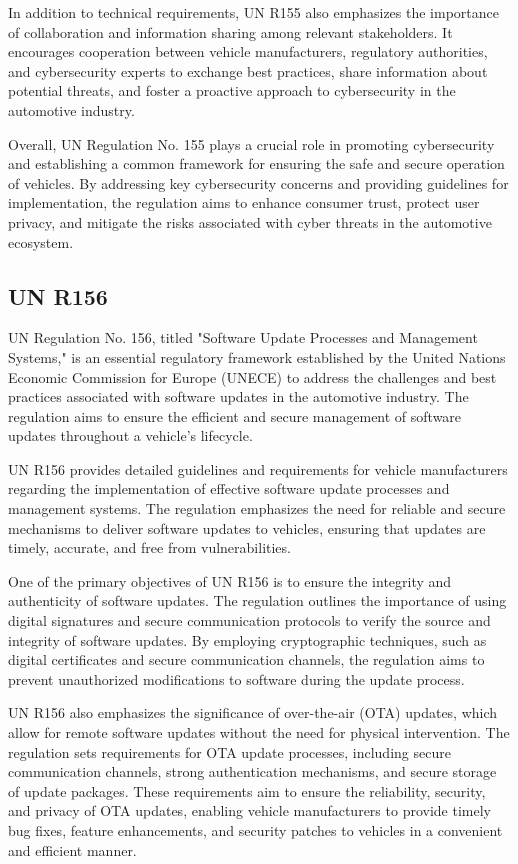 \documentclass[
12pt,
oneside, 
onehalfspacing, 
nolistspacing, 
parskip, 
chapterinoneline, 
]{AASTCOMPUTER}
\begin{document}
In addition to technical requirements, UN R155 also emphasizes the importance of collaboration and information sharing among relevant stakeholders. It encourages cooperation between vehicle manufacturers, regulatory authorities, and cybersecurity experts to exchange best practices, share information about potential threats, and foster a proactive approach to cybersecurity in the automotive industry.

Overall, UN Regulation No. 155 plays a crucial role in promoting cybersecurity and establishing a common framework for ensuring the safe and secure operation of vehicles. By addressing key cybersecurity concerns and providing guidelines for implementation, the regulation aims to enhance consumer trust, protect user privacy, and mitigate the risks associated with cyber threats in the automotive ecosystem.
\subsection{UN R156}
UN Regulation No. 156, titled "Software Update Processes and Management Systems," \cite{UNR156} is an essential regulatory framework established by the United Nations Economic Commission for Europe (UNECE) to address the challenges and best practices associated with software updates in the automotive industry. The regulation aims to ensure the efficient and secure management of software updates throughout a vehicle's lifecycle.

UN R156 provides detailed guidelines and requirements for vehicle manufacturers regarding the implementation of effective software update processes and management systems. The regulation emphasizes the need for reliable and secure mechanisms to deliver software updates to vehicles, ensuring that updates are timely, accurate, and free from vulnerabilities.

One of the primary objectives of UN R156 is to ensure the integrity and authenticity of software updates. The regulation outlines the importance of using digital signatures and secure communication protocols to verify the source and integrity of software updates. By employing cryptographic techniques, such as digital certificates and secure communication channels, the regulation aims to prevent unauthorized modifications to software during the update process.

UN R156 also emphasizes the significance of over-the-air (OTA) updates, which allow for remote software updates without the need for physical intervention. The regulation sets requirements for OTA update processes, including secure communication channels, strong authentication mechanisms, and secure storage of update packages. These requirements aim to ensure the reliability, security, and privacy of OTA updates, enabling vehicle manufacturers to provide timely bug fixes, feature enhancements, and security patches to vehicles in a convenient and efficient manner.
\end{document}

